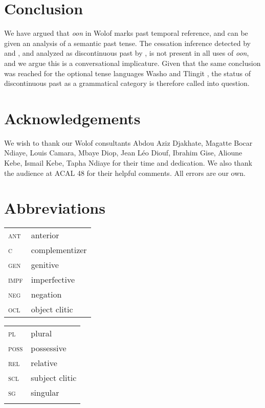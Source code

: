 \documentclass[output=paper,newtxmath,modfonts,nonflat,draftmode]{langsci/langscibook}
\begin{document}
\section{Conclusion}\label{sec:bochnak:6}

We have argued that \textit{oon} in Wolof marks past temporal reference, and can be given an analysis of a semantic past tense. The cessation inference detected by \citet{church81systeme} and
\citet{robert91approche}, and analyzed as discontinuous past by
\citet{Plungian2006}, is not present in all uses of \textit{oon},
and we argue this is a conversational implicature. Given that the same conclusion was reached for the optional tense languages Washo \citep{bochnak16past} and Tlingit \citep{Cable2017a}, the status of discontinuous past as a grammatical category is therefore called into question. 

\section*{Acknowledgements}

We wish to thank our Wolof consultants Abdou Aziz Djakhate, Magatte Bocar Ndiaye, Louis Camara, Mbaye
Diop, Jean L\'eo Diouf, Ibrahim Gise,  Alioune Kebe, Ismail Kebe,
Tapha Ndiaye for their time and dedication. We also thank the audience
at ACAL 48 for their helpful comments. All errors are our own.  


\section*{Abbreviations}

\begin{tabularx}{.5\textwidth}{@{}lQ@{}}
\textsc{ant}  &  anterior\\
 \textsc{c} &  complementizer\\
 \textsc{gen}  &  genitive\\
 \textsc{impf}  &  imperfective\\
 \textsc{neg}  & negation\\
 \textsc{ocl}  &  object clitic\\
\end{tabularx}%
\begin{tabularx}{.5\textwidth}{@{}lQ@{}}
 \textsc{pl}  &  plural\\
 \textsc{poss}  &  possessive\\
\textsc{rel}  &  relative\\
 \textsc{scl}  &  subject clitic\\
 \textsc{sg}  &  singular\\
 \\
\end{tabularx}



{\sloppy\printbibliography[heading=subbibliography,notkeyword=this]}
\end{document}
